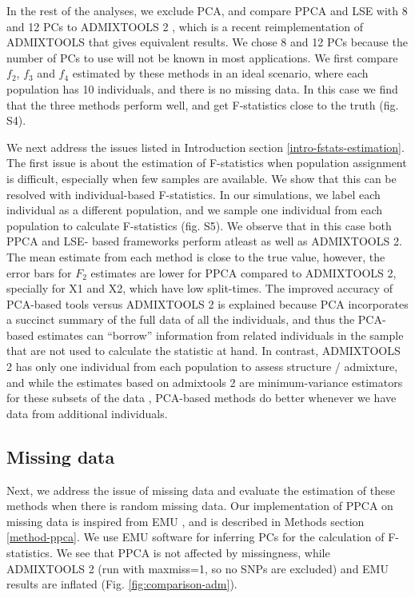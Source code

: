 \documentclass[12pt, letterpaper]{article}
\begin{document}
In the rest of the analyses, we exclude PCA, and compare PPCA and LSE with 8 and 12 PCs to ADMIXTOOLS 2 \cite{maier_limits_2022}, which is a recent reimplementation of ADMIXTOOLS \cite{patterson_ancient_2012} that gives equivalent results. We chose 8 and 12 PCs because the number of PCs to use will not be known in most applications. We first compare $f_2$, $f_3$ and $f_4$ estimated by these methods in an ideal scenario, where each population has 10 individuals, and there is no missing data. In this case we find that the three methods perform well, and get F-statistics close to the truth (fig. S4). 

We next address the issues listed in Introduction section \ref{intro-fstats-estimation}. The first issue is about the estimation of F-statistics when population assignment is difficult, especially when few samples are available. We show that this can be resolved with individual-based F-statistics. In our simulations, we label each individual as a different population, and we sample one individual from each population to calculate F-statistics (fig. S5). We observe that in this case both PPCA and LSE- based frameworks perform atleast as well as ADMIXTOOLS 2. The mean estimate from each method is close to the true value, however, the error bars for $F_2$ estimates are lower for PPCA compared to ADMIXTOOLS 2, specially for X1 and X2, which have low split-times. The improved accuracy of PCA-based tools versus ADMIXTOOLS 2 is explained because PCA incorporates a succinct summary of the full data of all the individuals, and thus the PCA-based estimates can ``borrow'' information from related individuals in the sample that are not used to calculate the statistic at hand. In contrast, ADMIXTOOLS 2 has only one individual from each population to assess structure / admixture, and while the estimates based on admixtools 2 are minimum-variance estimators for these subsets of the data \citep{patterson_ancient_2012}, PCA-based methods do better whenever we have data from additional individuals.     

\subsection{Missing data}
Next, we address the issue of missing data and evaluate the estimation of these methods when there is random missing data. Our implementation of PPCA on missing data is inspired from EMU \cite{meisner_large-scale_2021}, and is described in Methods section \ref{method-ppca}. We use EMU software for inferring PCs for the calculation of F-statistics. We see that PPCA is not affected by missingness, while ADMIXTOOLS 2 (run with maxmiss=1, so no SNPs are excluded) and EMU results are inflated (Fig. \ref{fig:comparison-adm}).
\end{document}
